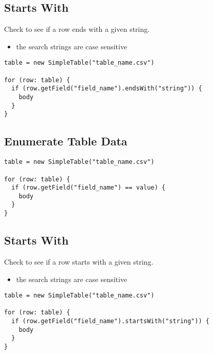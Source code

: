 \documentclass{article}
\begin{document}
\subsection{Starts With}
Check to see if a row ends with a given string.
\begin{itemize}
  \item the search strings are case sensitive
\end{itemize}
\begin{lstlisting}
table = new SimpleTable("table_name.csv")

for (row: table) {
  if (row.getField("field_name").endsWith("string")) {
    body
  }
}
\end{lstlisting}

\subsection{Enumerate Table Data}
\begin{lstlisting}
table = new SimpleTable("table_name.csv")

for (row: table) {
  if (row.getField("field_name") == value) {
    body
  }
}
\end{lstlisting}

\subsection{Starts With}
Check to see if a row starts with a given string.
\begin{itemize}
  \item the search strings are case sensitive
\end{itemize}
\begin{lstlisting}
table = new SimpleTable("table_name.csv")

for (row: table) {
  if (row.getField("field_name").startsWith("string")) {
    body
  }
}
\end{lstlisting}


\newpage

%

\end{document}

